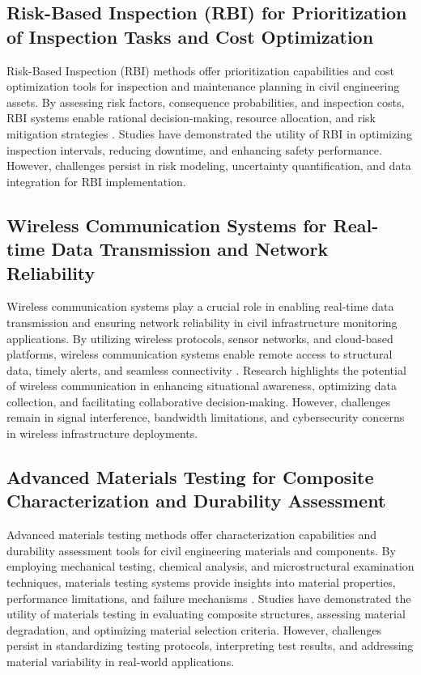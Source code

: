 \documentclass[journal, a4paper]{IEEEtran}
\begin{document}
\subsection{Risk-Based Inspection (RBI) for Prioritization of Inspection Tasks and Cost Optimization}
Risk-Based Inspection (RBI) methods offer prioritization capabilities and cost optimization tools for inspection
and maintenance planning in civil engineering assets. By assessing risk factors, consequence probabilities,
and inspection costs, RBI systems enable rational decision-making, resource allocation, and risk mitigation
strategies \cite{wu_internal_2024} \cite{zima_damage_2021} \cite{han_crack_2021}. Studies have demonstrated the utility of RBI in optimizing inspection intervals,
reducing downtime, and enhancing safety performance. However, challenges persist in risk modeling, uncertainty quantification,
and data integration for RBI implementation.

\subsection{Wireless Communication Systems for Real-time Data Transmission and Network Reliability}

Wireless communication systems play a crucial role in enabling real-time data transmission and ensuring
network reliability in civil infrastructure monitoring applications. By utilizing wireless protocols, sensor
networks, and cloud-based platforms, wireless communication systems enable remote access to structural data,
timely alerts, and seamless connectivity \cite{fang_structural_2024} \cite{zhang_structural_2021} \cite{yifei_structure_2023}. Research highlights the potential of wireless
communication in enhancing situational awareness, optimizing data collection, and facilitating collaborative
decision-making. However, challenges remain in signal interference, bandwidth limitations, and cybersecurity
concerns in wireless infrastructure deployments.

\subsection{Advanced Materials Testing for Composite Characterization and Durability Assessment}
Advanced materials testing methods offer characterization capabilities and durability assessment tools for
civil engineering materials and components. By employing mechanical testing, chemical analysis, and microstructural
examination techniques, materials testing systems provide insights into material properties, performance limitations,
and failure mechanisms \cite{meng_effects_2021} \cite{de_menezes_defect_2021} \cite{bevan_automated_2022}. Studies have demonstrated the utility of materials testing in evaluating
composite structures, assessing material degradation, and optimizing material selection criteria.
However, challenges persist in standardizing testing protocols, interpreting test results, and addressing
material variability in real-world applications.
\end{document}
